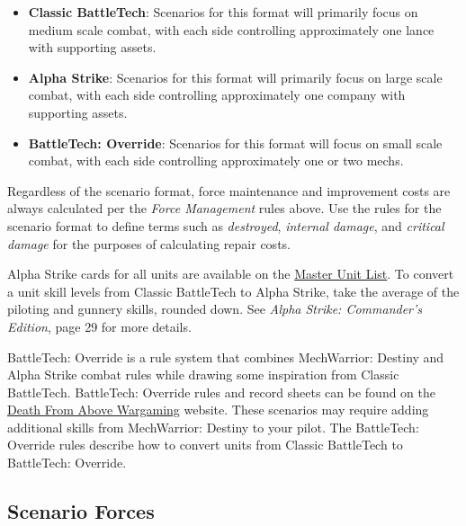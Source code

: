 \documentclass{article}
\begin{document}
\begin{itemize}

\item {\bfseries Classic BattleTech}: Scenarios for this format will primarily focus on medium scale combat, with each side controlling approximately one lance with supporting assets.

\item {\bfseries Alpha Strike}: Scenarios for this format will primarily focus on large scale combat, with each side controlling approximately one company with supporting assets.

\item {\bfseries BattleTech: Override}: Scenarios for this format will focus on small scale combat, with each side controlling approximately one or two mechs.

\end{itemize}

Regardless of the scenario format, force maintenance and improvement costs are always calculated per the \emph{Force Management} rules above.
Use the rules for the scenario format to define terms such as \emph{destroyed}, \emph{internal damage}, and \emph{critical damage} for the purposes of calculating repair costs.

Alpha Strike cards for all units are available on the \href{http://www.masterunitlist.info}{Master Unit List}.
To convert a unit skill levels from Classic BattleTech to Alpha Strike, take the average of the piloting and gunnery skills, rounded down.
See \emph{Alpha Strike: Commander's Edition}, page 29 for more details.

BattleTech: Override is a rule system that combines MechWarrior: Destiny and Alpha Strike combat rules while drawing some inspiration from Classic BattleTech.
BattleTech: Override rules and record sheets can be found on the \href{https://dfawargaming.com}{Death From Above Wargaming} website.
These scenarios may require adding additional skills from MechWarrior: Destiny to your pilot.
The BattleTech: Override rules describe how to convert units from Classic BattleTech to BattleTech: Override.

\subsection{Scenario Forces}
\end{document}
